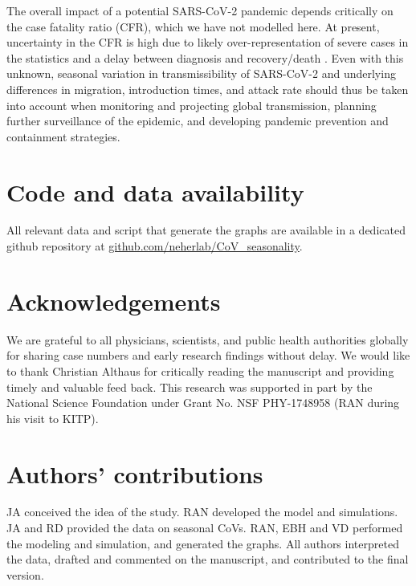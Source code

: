 \documentclass[rmp, reprint, superscriptaddress, floatfix,amsmath]{revtex4-1}
\begin{document}
The overall impact of a potential SARS-CoV-2 pandemic depends critically on the case fatality ratio (CFR), which we have not modelled here.
At present, uncertainty in the CFR is high due to likely over-representation of severe cases in the statistics and a delay between diagnosis and recovery/death  \citep{battegay_2019-novel_2020}.
Even with this unknown, seasonal variation in transmissibility of SARS-CoV-2 and underlying differences in migration, introduction times, and attack rate should thus be taken into account when monitoring and projecting global transmission, planning further surveillance of the epidemic, and developing pandemic prevention and containment strategies.

\section{Code and data availability}
All relevant data and script that generate the graphs are available in a dedicated github repository at \url{github.com/neherlab/CoV_seasonality}.

\section*{Acknowledgements}
We are grateful to all physicians, scientists, and public health authorities globally for sharing case numbers and early research findings without delay.
We would like to thank Christian Althaus for critically reading the manuscript and providing timely and valuable feed back.
This research was supported in part by the National Science Foundation under Grant No. NSF PHY-1748958 (RAN during his visit to KITP).

\section*{Authors' contributions}
JA conceived the idea of the study. RAN developed the model and simulations. JA and RD provided the data on seasonal CoVs. RAN, EBH and VD performed the modeling and simulation, and generated the graphs. All authors interpreted the data, drafted and commented on the manuscript, and contributed to the final version.



\newpage
\end{document}
